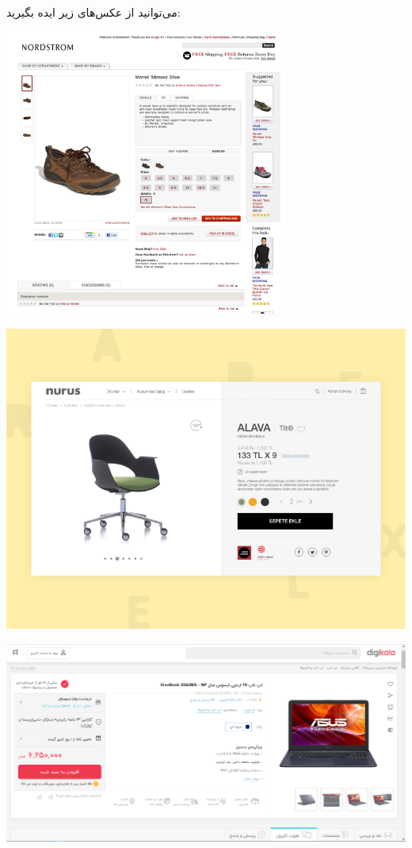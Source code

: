 \documentclass[]{article}
\begin{document}
می‌توانید از عکس‌های زیر ایده بگیرید:


\begin{center}
\includegraphics[width=0.7\textwidth]{images/image22.png}
\end{center}


\begin{center}
\includegraphics[width=1.0\textwidth]{images/image23.png}
\end{center}



\begin{center}
\includegraphics[width=1.0\textwidth]{images/image24.png}
\end{center}
\end{document}
